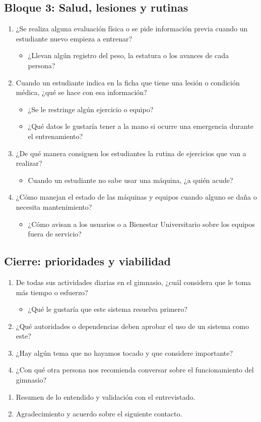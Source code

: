 \subsection*{Bloque 3: Salud, lesiones y rutinas}
\begin{enumerate}[resume*=preguntas]
  \item ¿Se realiza alguna evaluación física o se pide información previa cuando un estudiante nuevo empieza a entrenar?
  \begin{itemize}
    \item[R:] ¿Llevan algún registro del peso, la estatura o los avances de cada persona?
  \end{itemize}
  \item Cuando un estudiante indica en la ficha que tiene una lesión o condición médica, ¿qué se hace con esa información?
  \begin{itemize}
    \item[R:] ¿Se le restringe algún ejercicio o equipo?
    \item[R:] ¿Qué datos le gustaría tener a la mano si ocurre una emergencia durante el entrenamiento?
  \end{itemize}
  \item ¿De qué manera consiguen los estudiantes la rutina de ejercicios que van a realizar?
  \begin{itemize}
    \item[R:] Cuando un estudiante no sabe usar una máquina, ¿a quién acude?
  \end{itemize}
  \item ¿Cómo manejan el estado de las máquinas y equipos cuando alguno se daña o necesita mantenimiento?
  \begin{itemize}
    \item[R:] ¿Cómo avisan a los usuarios o a Bienestar Universitario sobre los equipos fuera de servicio?
  \end{itemize}
\end{enumerate}

\subsection*{Cierre: prioridades y viabilidad}
\begin{enumerate}[resume*=preguntas]
  \item De todas sus actividades diarias en el gimnasio, ¿cuál considera que le toma más tiempo o esfuerzo?
  \begin{itemize}
    \item[R:] ¿Qué le gustaría que este sistema resuelva primero?
  \end{itemize}
  \item ¿Qué autoridades o dependencias deben aprobar el uso de un sistema como este?
  \item ¿Hay algún tema que no hayamos tocado y que considere importante?
  \item ¿Con qué otra persona nos recomienda conversar sobre el funcionamiento del gimnasio?
\end{enumerate}

\begin{enumerate}[label=\alph*), start=4]
  \item Resumen de lo entendido y validación con el entrevistado.
  \item Agradecimiento y acuerdo sobre el siguiente contacto.
\end{enumerate}
